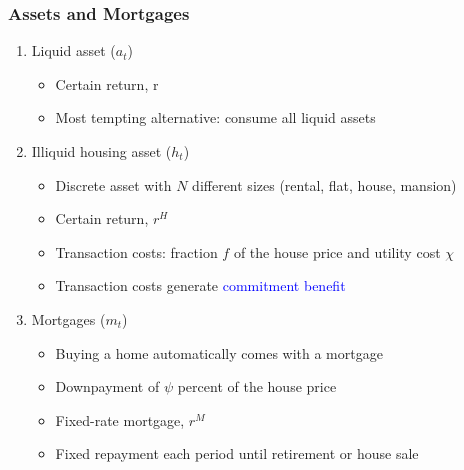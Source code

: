 \documentclass[10pt,english,t,10pt]{beamer}
\begin{document}
\begin{frame}
\frametitle{Assets and Mortgages}
\begin{enumerate}
\item Liquid asset ($a_t$)
\smallskip
\begin{itemize}
\item Certain return, r
\smallskip
\item Most tempting alternative: consume all liquid assets
\end{itemize}
\medskip \medskip \pause
\item Illiquid housing asset ($h_t$)
\smallskip
\begin{itemize}
\item Discrete asset with $N$ different sizes (rental, flat, house, mansion)
\smallskip
\item Certain return, $r^H$
\smallskip
\item Transaction costs: fraction $f$ of the house price and utility cost $\chi$
\smallskip
\item Transaction costs generate \textcolor{blue}{commitment benefit}
\end{itemize}
\medskip \medskip
\pause
\item Mortgages ($m_t$)
\smallskip
\begin{itemize}
\item Buying a home automatically comes with a mortgage
\smallskip
\item Downpayment of $\psi$ percent of the house price
\smallskip
\item Fixed-rate mortgage, $r^M$
\smallskip
\item Fixed repayment each period until retirement or house sale
\end{itemize}
\end{enumerate}
\end{frame}
\end{document}
